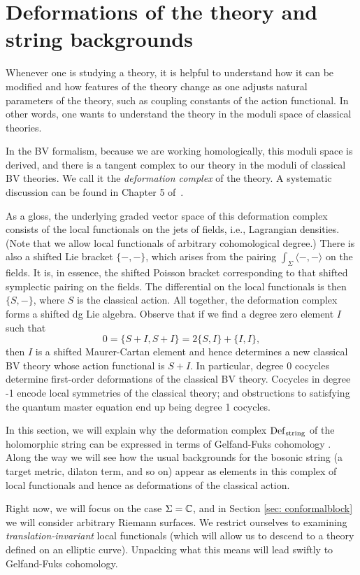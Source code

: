 \section{Deformations of the theory and string backgrounds}
\label{sec: moduli}

Whenever one is studying a theory,
it is helpful to understand how it can be modified 
and how features of the theory change as one adjusts natural parameters of the theory,
such as coupling constants of the action functional.
In other words, one wants to understand the theory in the moduli space of classical theories.

In the BV formalism, because we are working homologically, this moduli space is derived,
and there is a tangent complex to our theory in the moduli of classical BV theories.
We call it the {\em deformation complex} of the theory.
A systematic discussion can be found in Chapter 5 of~\cite{CosBook}.

As a gloss, the underlying graded vector space of this deformation complex consists of the local functionals on the jets of fields, i.e., Lagrangian densities.
(Note that we allow local functionals of arbitrary cohomological degree.) 
There is also a shifted Lie bracket $\{-,-\}$, 
which arises from the pairing $\int_\Sigma \langle-,-\rangle$ on the fields.
It is, in essence, the shifted Poisson bracket corresponding to that shifted symplectic pairing on the fields.
The differential on the local functionals is then $\{S,-\}$, where $S$ is the classical action. 
All together, the deformation complex forms a shifted dg Lie algebra. 
Observe that if we find a degree zero element $I$ such that
\[
0=\{S +I,S +I\}=2\{S,I\}+\{I,I\},
\]
then $I$ is a shifted Maurer-Cartan element and 
hence determines a new classical BV theory whose action functional is $S + I$. 
In particular, degree 0 cocycles determine first-order deformations of the classical BV theory. Cocycles in degree -1 encode local symmetries of the classical theory; 
and obstructions to satisfying the quantum master equation end up being degree 1 cocycles.

In this section, we will explain why the deformation complex ${\rm Def}_{\rm string}$ of the holomorphic string 
can be expressed in terms of Gelfand-Fuks cohomology \cite{Fuks}. 
Along the way we will see how the usual backgrounds for the bosonic string (a target metric, dilaton term, and so on) appear as elements in this complex of local functionals and hence as deformations of the classical action. 

Right now, we will focus on the case $\Sigma = \mathbb C$, 
and in Section \ref{sec: conformalblock} we will consider arbitrary Riemann surfaces.
We restrict ourselves to examining {\em translation-invariant} local functionals (which will allow us to descend to a theory defined on an elliptic curve).
Unpacking what this means will lead swiftly to Gelfand-Fuks cohomology.

